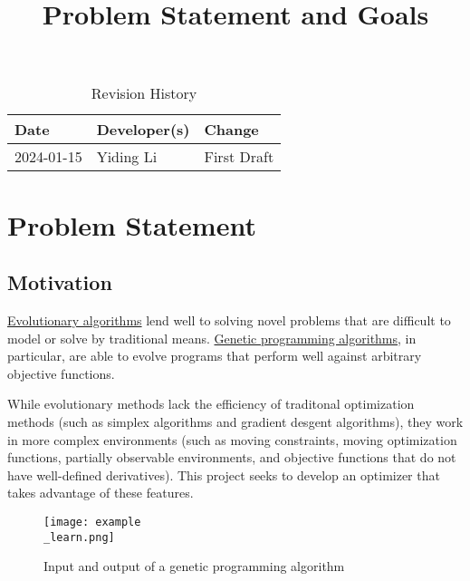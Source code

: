 \documentclass{article}
\title{Problem Statement and Goals\\\progname}
\author{\authname}
\date{}
\begin{document}
\maketitle

\begin{table}[hp]
\caption{Revision History} \label{TblRevisionHistory}
\begin{tabularx}{\textwidth}{llX}
\toprule
\textbf{Date} & \textbf{Developer(s)} & \textbf{Change}\\
\midrule
2024-01-15 & Yiding Li & First Draft\\
\bottomrule
\end{tabularx}
\end{table}

\section{Problem Statement}


\subsection{Motivation}


\hyperref[sec:evalg]{Evolutionary algorithms} lend well to solving novel problems that are difficult to model or solve by traditional means. \hyperref[sec:genalg]{Genetic programming algorithms}, in particular, are able to evolve programs that perform well against arbitrary objective functions.

While evolutionary methods lack the efficiency of traditonal optimization methods (such as simplex algorithms and gradient desgent algorithms), they work in more complex environments (such as moving constraints, moving optimization functions, partially observable environments, and objective functions that do not have well-defined derivatives). This project seeks to develop an optimizer that takes advantage of these features.


\begin{figure}[h]
    \caption{Input and output of a genetic programming algorithm}
    \texttt{[image: example\\\_learn.png]}
    \centering
\end{figure}
\end{document}

